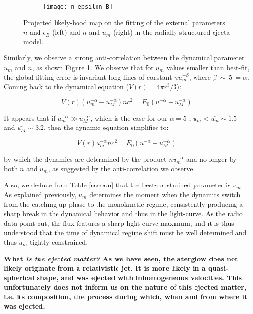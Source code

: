 \begin{figure}
\centering
\begin{subfigure}
    \centering
    \texttt{[image: n\_epsilon\_B]}
\end{subfigure}%
\begin{subfigure}
    \texttt{[image: umn]}
\end{subfigure}
\caption{Projected likely-hood map on the fitting of the external parameters $n$ and $\epsilon_B$ (left) and $n$ and $u_m$ (right) in the radially structured ejecta model.}
\label{n_epsilon_B}
\end{figure}


Similarly, we observe a strong anti-correlation between the dynamical parameter $u_m$ and $n$, as shown Figure \ref{n_epsilon_B}. We observe that for $u_m$ values smaller than best-fit, the global fitting error is invariant long lines of constant $nu_m^{-\beta}$, where $\beta~\sim~5~=\alpha$. Coming back to the dynamical equation ($V(r) = 4\pi r^3/3$):

$$V(r)(u_m^{-\alpha} - u_M^{-\alpha}) n c ^ 2= E_0 (u^{-\alpha} - u_M^{-\alpha}) $$

It appears that if $u_m^{-\alpha} \gg u_M^{-\alpha}$, which is the case for our $\alpha = 5$ , $u_m < \bar{u_m} \sim 1.5$ and $\bar{u_M} \sim 3.2$, then the dynamic equation simplifies to:

$$V(r) u_m^{-\alpha} nc^2 = E_0 (u^{-\alpha} - u_M^{-\alpha}) $$

by which the dynamics are determined by the product $n u_m^{-\alpha}$ and no longer by both $n$ and $u_m$, as suggested by the anti-correlation we observe.

Also, we deduce from Table \ref{cocoon} that the best-constrained parameter is $u_m$. As explained previously, $u_m$ determines the moment when the dynamics switch from the catching-up phase to the monokinetic regime, consistently producing a sharp break in the dynamical behavior and thus in the light-curve. As the radio data point out, the flux features a sharp light curve maximum, and it is thus understood that the time of dynamical regime shift must be well determined and thus $u_m$ tightly constrained.

\bf{What \it{is} the ejected matter? }As we have seen, the aterglow does not likely originate from a relativistic jet. It is more likely in a quasi-spherical shape, and was ejected with inhomogeneous velocities. This unfortunately does not inform us on the nature of this ejected matter, i.e. its composition, the process during which, when and from where it was ejected.


